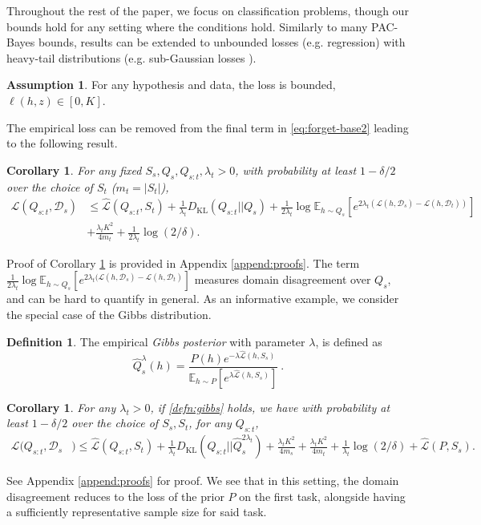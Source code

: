 \documentclass{article}
\theoremstyle{plain}
\newtheorem{corollary}[theorem]{Corollary}
\theoremstyle{definition}
\newtheorem{definition}[theorem]{Definition}
\newtheorem{assumption}[theorem]{Assumption}
\theoremstyle{remark}
\begin{document}
Throughout the rest of the paper, we focus on classification problems, though our bounds hold for any setting where the conditions hold. Similarly to many PAC-Bayes bounds, results can be extended to unbounded losses (e.g. regression) with heavy-tail distributions (e.g. sub-Gaussian losses \citep{alquier2016properties, alquier2021user}).
%
\begin{assumption}
For any hypothesis and data, the loss is bounded, $\ell(h,z)\in [0, K].$
\end{assumption}
The empirical loss can be removed from the final term in \eqref{eq:forget-base2} leading to the following result.

\begin{corollary}\label{thm:first}
For any fixed $S_s,Q_s,Q_{s:t},\lambda_t>0$, with probability at least $1-\delta/2$ over the choice of $S_t$ ($m_t=|S_t|$),
\begin{align}
\mathcal{L}(Q_{s:t}, \mathcal{D}_s) &\leq \hat{\mathcal{L}}(Q_{s:t}, S_t) + \frac{1}{\lambda_t} D_{\mathrm{KL}}(Q_{s:t}||Q_{s})\nonumber
+\frac{1}{2\lambda_t}\log \mathbb{E}_{h\sim Q_{s}}\left [e^{2\lambda_t(\mathcal{L}(h,\mathcal{D}_s)-\mathcal{L}(h,\mathcal{D}_t))}\right ]\nonumber\\ &+\frac{\lambda_t K^2}{4m_t}+\frac{1}{2\lambda_t}\log(2/\delta) .
\end{align}
\end{corollary}

Proof of Corollary \ref{thm:first} is provided in Appendix \ref{append:proofs}. The term $\frac{1}{2\lambda_t}\log \mathbb{E}_{h\sim Q_{s}}\left [e^{2\lambda_t(\mathcal{L}(h,\mathcal{D}_s)-\mathcal{L}(h,\mathcal{D}_t)}\right ]$ measures domain disagreement over $Q_s$, and can be hard to quantify in general. As an informative example, we  consider the special case of the Gibbs distribution.
%
\begin{definition}
    The empirical \emph{Gibbs posterior} with parameter $\lambda$, is defined as 
\begin{equation} \label{defn:gibbs}
\hat Q^\lambda_s(h)=\frac{P(h)e^{-\lambda\hat{\mathcal{L}}(h,S_s)}}{\mathbb{E}_{h\sim P}\left [e^{\lambda\hat{\mathcal{L}}(h,S_s)} \right ]}~ .
\end{equation}
\end{definition}
%
\begin{corollary}
 \label{thm:gibbs-general}
For any $\lambda_t>0$, if \eqref{defn:gibbs} holds, we have with probability at least $1-\delta/2$ over the choice of $S_s,S_t$, for any $Q_{s:t}$, 
%
\begin{align*}
\mathcal{L}(Q_{s:t}, \mathcal{D}_s&) \leq \hat{\mathcal{L}}(Q_{s:t}, S_t) + \frac{1}{\lambda_t} D_{\mathrm{KL}}(Q_{s:t}||\hat{Q}_{s}^{2\lambda_t}) 
+\frac{\lambda_t K^2}{4m_s}+\frac{\lambda_t K^2}{4m_t}+\frac{1}{\lambda_t}\log(2/\delta)+ \hat{\mathcal{L}}(P, S_s) . 
\end{align*}
\end{corollary}
%
See Appendix \ref{append:proofs} for proof. We see that in this setting, the domain disagreement reduces to the loss of the prior $P$ on the first task, alongside having a sufficiently representative sample size for said task.
\end{document}
